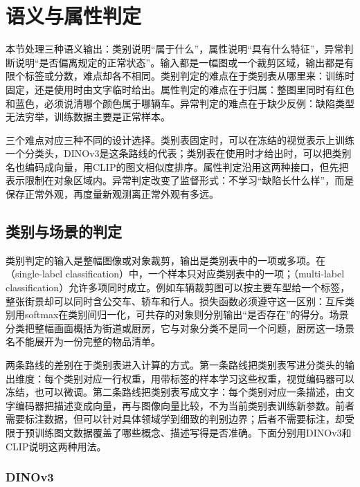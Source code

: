 \section{语义与属性判定}
\label{sec:vision-recognition-semantics}

本节处理三种语义输出：类别说明“属于什么”，属性说明“具有什么特征”，异常判断说明“是否偏离规定的正常状态”。输入都是一幅图或一个裁剪区域，输出都是有限个标签或分数，难点却各不相同。类别判定的难点在于类别表从哪里来：训练时固定，还是使用时由文字临时给出。属性判定的难点在于归属：整图里同时有红色和蓝色，必须说清哪个颜色属于哪辆车。异常判定的难点在于缺少反例：缺陷类型无法穷举，训练数据主要是正常样本。

三个难点对应三种不同的设计选择。类别表固定时，可以在冻结的视觉表示上训练一个分类头，DINOv3是这条路线的代表；类别表在使用时才给出时，可以把类别名也编码成向量，用CLIP的图文相似度排序。属性判定沿用这两种接口，但先把表示限制在对象区域内。异常判定改变了监督形式：不学习“缺陷长什么样”，而是保存正常外观，再度量新观测离正常外观有多远。

\subsection{类别与场景的判定}
\label{sec:vision-recognition-classification}

类别判定的输入是整幅图像或对象裁剪，输出是类别表中的一项或多项。在（single-label classification）中，一个样本只对应类别表中的一项；（multi-label classification）允许多项同时成立。例如车辆裁剪图可以按主要车型给一个标签，整张街景却可以同时含公交车、轿车和行人。损失函数必须遵守这一区别：互斥类别用softmax在类别间归一化，可共存的对象则分别输出“是否存在”的得分。场景分类把整幅画面概括为街道或厨房，它与对象分类不是同一个问题，厨房这一场景名不能展开为一份完整的物品清单。

两条路线的差别在于类别表进入计算的方式。第一条路线把类别表写进分类头的输出维度：每个类别对应一行权重，用带标签的样本学习这些权重，视觉编码器可以冻结，也可以微调。第二条路线把类别表写成文字：每个类别对应一条描述，由文字编码器把描述变成向量，再与图像向量比较，不为当前类别表训练新参数。前者需要标注数据，但可以针对具体领域学到细致的判别边界；后者不需要标注，却受限于预训练图文数据覆盖了哪些概念、描述写得是否准确。下面分别用DINOv3和CLIP说明这两种用法。

\subsubsection{DINOv3}
\label{sec:vision-recognition-dinov3}

